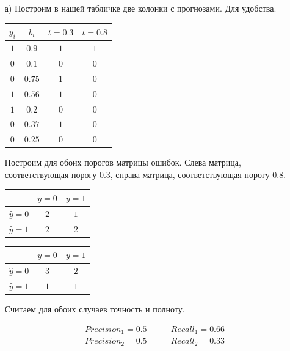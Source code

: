 \documentclass[12pt, a4paper, oneside]{article}
\theoremstyle{plain} %
\theoremstyle{definition}
\begin{document}
\begin{solution}
	\begin{enumerate}
		\item[а)]  Построим в нашей табличке две колонки с прогнозами. Для удобства. 
		
		\begin{center}
			\begin{tabular}{c|c|c|c}
				$y_i$ & $b_i$ & $t=0.3$  & $t=0.8$\\
				\hline
				$1$  & $0.9$ & $1$ & $1$ \\
				$0$ & $0.1$ & $0$ & $0$\\
				$0$ & $0.75$ & $1$ & $0$\\
				$1$ & $0.56$ & $1$ & $0$\\
				$1$ & $0.2$ & $0$ & $0$ \\
				$0$ & $0.37$ & $1$ & $0$\\
				$0$ & $0.25$ & $0$ & $0$ \\		
			\end{tabular}
		\end{center}
		
		Построим для обоих порогов матрицы ошибок. Слева матрица, соответствующая порогу $0.3$, справа матрица, соответствующая порогу $0.8$.
		
		\begin{minipage}[t]{0.45\textwidth}
			\begin{tabular}{|c|c|c|}
				\hline
				& $y=0$  &  $ y = 1$ \\  \hline 
				$\hat y = 0$  &   $2$ &    $1$ \\      \hline 
				$\hat y = 1$ &   $2$ &    $2$ \\      \hline
			\end{tabular}
		\end{minipage}
		\begin{minipage}[t]{0.45\textwidth}
			\begin{tabular}{|c|c|c|}
				\hline
				& $y=0$  &  $ y = 1$ \\  \hline 
				$\hat y = 0$  &   $3$ &    $2$ \\      \hline 
				$\hat y = 1$ &   $1$ &    $1$ \\      \hline
			\end{tabular}
		\end{minipage}
		
		Считаем для обоих случаев точность и полноту. 
		
		\begin{equation} 
		\begin{aligned}
		&Precision_1 = 0.5     \qquad &Recall_1 = 0.66  \\ 
		&Precision_2 = 0.5  \qquad &Recall_2 =  0.33   \\ 
		\end{aligned}
		\end{equation} 
		

\end{enumerate}
\end{solution}
\end{document}
